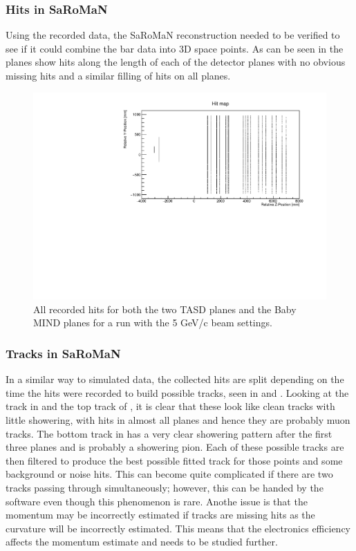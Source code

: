 \subsubsection{Hits in SaRoMaN}
Using the recorded data, the SaRoMaN reconstruction needed to be verified to see if it could combine the bar data into 3D space points. As can be seen in  the planes show hits along the length of each of the detector planes with no obvious missing hits and a similar filling of hits on all planes.

\begin{figure}[h!]
\centering
\includegraphics[width=\textwidth]{figures/HitMap5GeVYZ.pdf}
\caption{All recorded hits for both the two TASD planes and the Baby MIND planes for a run with the 5 GeV/c beam settings.}
\label{fig:hitmap}
\end{figure}


\subsubsection{Tracks in SaRoMaN}
In a similar way to simulated data, the collected hits are split depending on the time the hits were recorded to build possible tracks, seen in  and . Looking at the track in  and the top track of , it is clear that these look like clean tracks with little showering, with hits in almost all planes and hence they are probably muon tracks. The bottom track in  has a very clear showering pattern after the first three planes and is probably a showering pion. Each of these possible tracks are then filtered to produce the best possible fitted track for those points and some background or noise hits. This can become quite complicated if there are two tracks passing through simultaneously; however, this can be handed by the software even though this phenomenon is rare. Anothe issue is that the momentum may be incorrectly estimated if tracks are missing hits as the curvature will be incorrectly estimated. This means that the electronics efficiency affects the momentum estimate and needs to be studied further.

